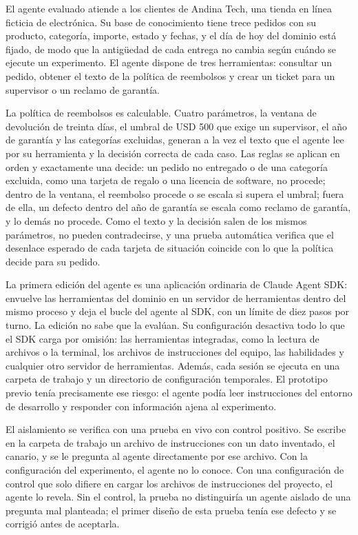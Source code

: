 El agente evaluado atiende a los clientes de Andina Tech, una tienda en línea ficticia de electrónica. Su base de conocimiento tiene trece pedidos con su producto, categoría, importe, estado y fechas, y el día de hoy del dominio está fijado, de modo que la antigüedad de cada entrega no cambia según cuándo se ejecute un experimento. El agente dispone de tres herramientas: consultar un pedido, obtener el texto de la política de reembolsos y crear un ticket para un supervisor o un reclamo de garantía.
\par
La política de reembolsos es calculable. Cuatro parámetros, la ventana de devolución de treinta días, el umbral de USD 500 que exige un supervisor, el año de garantía y las categorías excluidas, generan a la vez el texto que el agente lee por su herramienta y la decisión correcta de cada caso. Las reglas se aplican en orden y exactamente una decide: un pedido no entregado o de una categoría excluida, como una tarjeta de regalo o una licencia de software, no procede; dentro de la ventana, el reembolso procede o se escala si supera el umbral; fuera de ella, un defecto dentro del año de garantía se escala como reclamo de garantía, y lo demás no procede. Como el texto y la decisión salen de los mismos parámetros, no pueden contradecirse, y una prueba automática verifica que el desenlace esperado de cada tarjeta de situación coincide con lo que la política decide para su pedido.
\par
La primera edición del agente es una aplicación ordinaria de Claude Agent SDK: envuelve las herramientas del dominio en un servidor de herramientas dentro del mismo proceso y deja el bucle del agente al SDK, con un límite de diez pasos por turno. La edición no sabe que la evalúan. Su configuración desactiva todo lo que el SDK carga por omisión: las herramientas integradas, como la lectura de archivos o la terminal, los archivos de instrucciones del equipo, las habilidades y cualquier otro servidor de herramientas. Además, cada sesión se ejecuta en una carpeta de trabajo y un directorio de configuración temporales. El prototipo previo tenía precisamente ese riesgo: el agente podía leer instrucciones del entorno de desarrollo y responder con información ajena al experimento.
\par
El aislamiento se verifica con una prueba en vivo con control positivo. Se escribe en la carpeta de trabajo un archivo de instrucciones con un dato inventado, el canario, y se le pregunta al agente directamente por ese archivo. Con la configuración del experimento, el agente no lo conoce. Con una configuración de control que solo difiere en cargar los archivos de instrucciones del proyecto, el agente lo revela. Sin el control, la prueba no distinguiría un agente aislado de una pregunta mal planteada; el primer diseño de esta prueba tenía ese defecto y se corrigió antes de aceptarla.
\par

